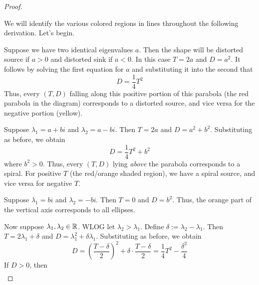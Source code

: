 \documentclass[../psets.tex]{subfiles}
\begin{document}
\begin{enumerate}
\begin{enumerate}
\begin{proof}
\begin{center}
            \end{center}
            We will identify the various colored regions in lines throughout the following derivation. Let's begin.\par
            Suppose we have two identical eigenvalues $a$. Then the shape will be distorted source if $a>0$ and distorted sink if $a<0$. In this case $T=2a$ and $D=a^2$. It follows by solving the first equation for $a$ and substituting it into the second that
            \begin{equation*}
                D = \frac{1}{4}T^2
            \end{equation*}
            Thus, every $(T,D)$ falling along this positive portion of this parabola (the red parabola in the diagram) corresponds to a distorted source, and vice versa for the negative portion (yellow).\par
            Suppose $\lambda_1=a+bi$ and $\lambda_2=a-bi$. Then $T=2a$ and $D=a^2+b^2$. Substituting as before, we obtain
            \begin{equation*}
                D = \frac{1}{4}T^2+b^2
            \end{equation*}
            where $b^2>0$. Thus, every $(T,D)$ lying \emph{above} the parabola corresponds to a spiral. For positive $T$ (the red/orange shaded region), we have a spiral source, and vice versa for negative $T$.\par
            Suppose $\lambda_1=bi$ and $\lambda_2=-bi$. Then $T=0$ and $D=b^2$. Thus, the orange part of the vertical axis corresponds to all ellipses.\par
            Now suppose $\lambda_1,\lambda_2\in\mathbb{R}$. WLOG let $\lambda_2>\lambda_1$. Define $\delta:=\lambda_2-\lambda_1$. Then $T=2\lambda_1+\delta$ and $D=\lambda_1^2+\delta\lambda_1$. Substituting as before, we obtain
            \begin{equation*}
                D = \left( \frac{T-\delta}{2} \right)^2+\delta\cdot\frac{T-\delta}{2}
                = \frac{1}{4}T^2-\frac{\delta^2}{4}
            \end{equation*}
            If $D>0$, then
            \begin{align*}

\end{align*}
\end{proof}
\end{enumerate}
\end{enumerate}
\end{document}
